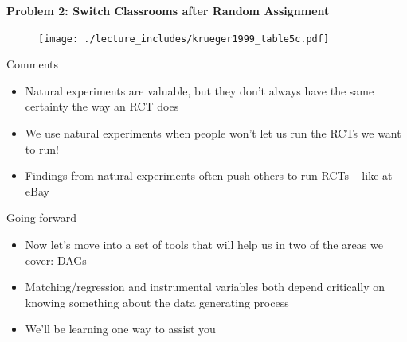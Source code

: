 \documentclass{beamer}
\begin{document}
\begin{frame}[plain]
	\begin{center}
	\textbf{Problem 2: Switch Classrooms after Random Assignment}
	\end{center}
	
	\begin{figure}
	\texttt{[image: ./lecture\_includes/krueger1999\_table5c.pdf]}
	\end{figure}
\end{frame}




\begin{frame}{Comments}

\begin{itemize}
\item Natural experiments are valuable, but they don't always have the same certainty the way an RCT does
\item We use natural experiments when people won't let us run the RCTs we want to run!
\item Findings from natural experiments often push others to run RCTs -- like at eBay
\end{itemize}

\end{frame}


\begin{frame}{Going forward}

\begin{itemize}

\item Now let's move into a set of tools that will help us in two of the areas we cover:  DAGs
\item Matching/regression and instrumental variables both depend critically on knowing something about the data generating process
\item We'll be learning one way to assist you
\end{itemize}

\end{frame}
\end{document}
